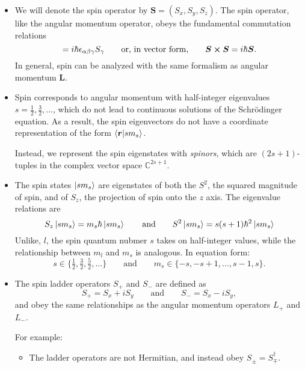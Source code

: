 \documentclass[11pt, a4paper]{article}
\newcommand{\eqtext}[1]{\qquad \text{#1} \qquad}
\newcommand{\Schro}{Schr\"{o}dinger\xspace}
\newcommand{\Herm}{Hermitian\xspace}
\renewcommand{\vec}[1]{\bm{#1}}  %
\renewcommand{\r}{\vec{r}}  %
\renewcommand{\L}{\vec{L}}  %
\renewcommand{\S}{\vec{S}}  %
\begin{document}
\begin{itemize}
	\item We will denote the spin operator by $ \S = (S_{x}, S_{y}, S_{z}) $. The spin operator, like the angular momentum operator, obeys the fundamental commutation relations
	\begin{equation*}
		[S_{\alpha}, S_{\beta}] = i \hbar \epsilon_{\alpha \beta \gamma}S_{\gamma} \eqtext{or, in vector form,} \S \cross \S = i \hbar \S.
	\end{equation*}
    In general, spin can be analyzed with the same formalism as angular momentum $ \L $.
	
    \item Spin corresponds to angular momentum with half-integer eigenvalues $ s = \frac{1}{2}, \frac{3}{2}, \ldots $, which do not lead to continuous solutions of the \Schro equation. As a result, the spin eigenvectors do not have a coordinate representation of the form $ \braket{\r}{sm_{s}} $. 
	
	Instead, we represent the spin eigenstates with \textit{spinors}, which are $ (2s+1) $-tuples in the complex vector space $ \mathbb{C}^{2s + 1} $. 
	
	\item The spin states $ \ket{sm_{s}} $ are eigenstates of both the $ S^{2} $, the squared magnitude of spin, and of $ S_{z} $, the projection of spin onto the $ z $ axis. The eigenvalue relations are
	\begin{equation*}
		S_{z}\ket{sm_{s}} = m_{s}\hbar \ket{sm_{s}} \eqtext{and} S^{2}\ket{sm_{s}} = s(s+1) \hbar^{2} \ket{sm_{s}}
	\end{equation*}
	Unlike, $ l $, the spin quantum nubmer $ s $ takes on half-integer values, while the relationship between $ m_{l} $ and $ m_{s} $ is analogous. In equation form:
	\begin{equation*}
        s \in \{\tfrac{1}{2}, \tfrac{3}{2}, \tfrac{5}{2}, \ldots \} \eqtext{and} m_{s} \in \{-s, -s+1, \ldots, s-1, s\}.
	\end{equation*}

	\item The spin ladder operators $ S_{+} $ and $ S_{-} $ are defined as
	\begin{equation*}
        S_{+} = S_{x} + iS_{y} \eqtext{and} S_{-} = S_{x} - i S_{y},
    \end{equation*}
    and obey the same relationships as the angular momentum operators $ L_{+} $ and $ L_{-} $.

    For example:
    \begin{itemize}
        \item The ladder operators are not \Herm, and instead obey $ S_{\pm} = S_{\mp}^{\dagger} $. 


\end{itemize}
\end{itemize}
\end{document}
